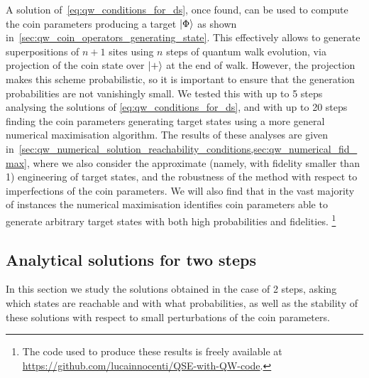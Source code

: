 A solution of~\cref{eq:qw_conditions_for_ds}, once found, can be used to compute the coin parameters producing a target $\ket\Phi$ as shown in~\cref{sec:qw_coin_operators_generating_state}.
This effectively allows to generate superpositions of $n+1$ sites using $n$ steps of quantum walk evolution, via projection of the coin state over $\ket+$ at the end of walk.
However, the projection makes this scheme probabilistic, so it is important to ensure that the generation probabilities are not vanishingly small.
We tested this with up to 5 steps analysing the solutions of \cref{eq:qw_conditions_for_ds}, and with up to 20 steps finding the coin parameters generating target states using a more general numerical maximisation algorithm.
The results of these analyses are given in~\cref{sec:qw_numerical_solution_reachability_conditions,sec:qw_numerical_fid_max},
where we also consider the approximate (namely, with fidelity smaller than 1) engineering of target states,
and the robustness of the method with respect to imperfections of the coin parameters.
We will also find that in the vast majority of instances the numerical maximisation identifies coin parameters able to generate arbitrary target states with both high probabilities and fidelities.
\footnote{The code used to produce these results is freely available at \href{https://github.com/lucainnocenti/QSE-with-QW-code}{https://github.com/lucainnocenti/QSE-with-QW-code}.}

\subsection{Analytical solutions for two steps}
\label{sec:qw_analytical_sol_2steps}

In this section we study the solutions obtained in the case of 2 steps, asking which states are reachable and with what probabilities, as well as the stability of these solutions with respect to small perturbations of the coin parameters.

